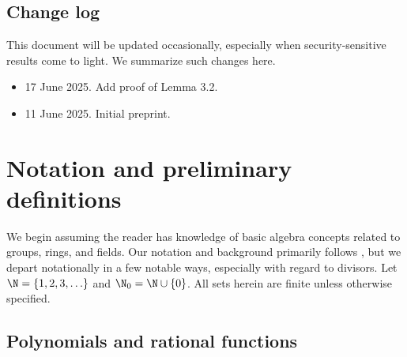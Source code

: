 \documentclass[11pt,letterpaper]{article}
\theoremstyle{definition}
\newcommand{\6}{\mathbf}
\newcommand{\7}{\mathcal}
\begin{document}

\subsection{Change log}

This document will be updated occasionally, especially when security-sensitive results come to light. We summarize such changes here.
\begin{itemize}
\item 17 June 2025. Add proof of Lemma 3.2.

\item 11 June 2025. Initial preprint.
\end{itemize}


\section{Notation and preliminary definitions}

We begin assuming the reader has knowledge of basic algebra concepts related to groups, rings, and fields. Our notation and background primarily follows \cite{Silverman}, but we depart notationally in a few notable ways, especially with regard to divisors. Let $\N = \left\{1, 2, 3, \ldots\right\}$ and $\N_0 = \N \cup \left\{0\right\}$. All sets herein are finite unless otherwise specified. 

\subsection{Polynomials and rational functions}
\end{document}
